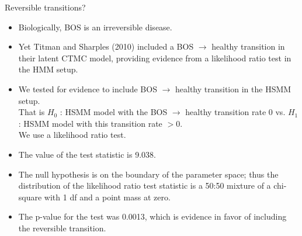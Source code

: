 \documentclass{beamer}
\begin{document}
\begin{frame}{Reversible transitions?}
\begin{itemize}
\item Biologically, BOS is an irreversible disease.
\vspace{3mm}
\item Yet Titman and Sharples (2010) included a BOS $\rightarrow$ healthy transition in their latent CTMC model, providing evidence from a likelihood ratio test in the HMM setup.
\vspace{3mm}
\item We tested for evidence to include BOS $\rightarrow$ healthy transition in the HSMM setup. \\ \vspace{2mm} That is $H_0$ : HSMM model with the BOS $\rightarrow$ healthy transition rate $0$ vs. $H_1$ : HSMM model with this transition rate $>0$. \\ \vspace{2mm} We use a likelihood ratio test.
\end{itemize}
\end{frame}
\begin{frame}
\begin{itemize}
\item The value of the test statistic is 9.038.
\vspace{3mm}
\item The null hypothesis is on the boundary of the parameter space; thus the distribution of the likelihood ratio test statistic is a 50:50 mixture of a chi-square with 1 df and a point mass at zero. \citep{self1987asymptotic}
\vspace{3mm}
\item The p-value for the test was 0.0013, which is evidence in favor of including the reversible transition.
\end{itemize}
\end{frame}
\end{document}
